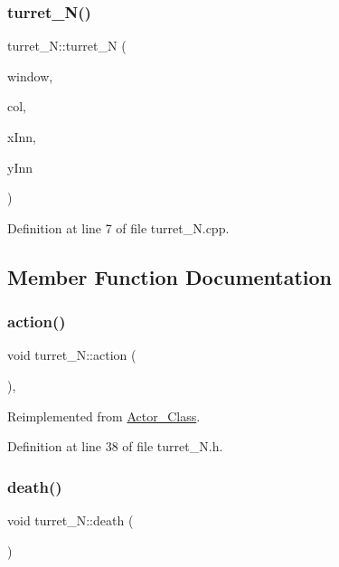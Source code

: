 \subsubsection{\texorpdfstring{turret\+\_\+\+N()}{turret\_N()}}
{\footnotesize\ttfamily turret\+\_\+\+N\+::turret\+\_\+N (\begin{DoxyParamCaption}\item[{sf\+::\+Render\+Window \&}]{window,  }\item[{\hyperlink{class_collision}{Collision}}]{col,  }\item[{int}]{x\+Inn,  }\item[{int}]{y\+Inn }\end{DoxyParamCaption})}



Definition at line 7 of file turret\+\_\+\+N.\+cpp.



\subsection{Member Function Documentation}
\hypertarget{classturret___n_a888cc034380c572a17a38e0f3c2fb9bd}{}\label{classturret___n_a888cc034380c572a17a38e0f3c2fb9bd} 
\subsubsection{\texorpdfstring{action()}{action()}}
{\footnotesize\ttfamily void turret\+\_\+\+N\+::action (\begin{DoxyParamCaption}{ }\end{DoxyParamCaption})\hspace{0.3cm}{\ttfamily [inline]}, {\ttfamily [virtual]}}



Reimplemented from \hyperlink{class_actor___class_ab8e23ffae108da3b8eda67c6753bdae0}{Actor\+\_\+\+Class}.



Definition at line 38 of file turret\+\_\+\+N.\+h.

\hypertarget{classturret___n_a8004a2fe2a3ab77b0da93ef0e26635ce}{}\label{classturret___n_a8004a2fe2a3ab77b0da93ef0e26635ce} 
\subsubsection{\texorpdfstring{death()}{death()}}
{\footnotesize\ttfamily void turret\+\_\+\+N\+::death (\begin{DoxyParamCaption}{ }\end{DoxyParamCaption})\hspace{0.3cm}{\ttfamily [virtual]}}



